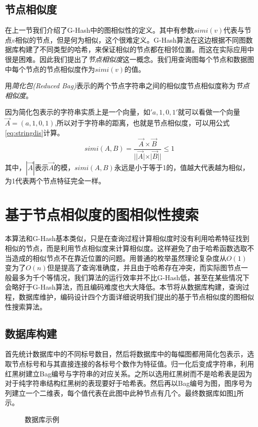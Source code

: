 \documentclass{XDBAthesis}
\begin{document}
\subsection{节点相似度}
在上一节我们介绍了G-Hash中的图相似性的定义。其中有参数$simi(v)$代表与节点$v$相似的节点，但是何为相似，这个很难定义。G-Hash算法在这边根据不同图数据库构建了不同类型的哈希，来保证相似的节点都在相邻位置。而这在实际应用中很是困难。因此我们提出了\emph{节点相似度}这一概念。我们用查询图每个节点和数据图中每个节点的节点相似度作为$simi(v)$的值。
\begin{defn}[节点相似度]
    用\emph{简化包(Reduced Bag)}表示的两个节点字符串之间的相似度节点相似度称为\emph{节点相似度}。
\end{defn}
因为简化包表示的字符串实质上是一个向量，如$'a,1,0,1'$就可以看做一个向量$\vec{A}=(a,1,0,1) $,所以对于字符串的距离，也就是节点相似度，可以用公式\eqref{eq:stringdis}计算。
\begin{equation}
    simi(A,B)=\frac{\vec{A}\times \vec{B}}{||\vec{A}|\times |\vec{B}||} \leq 1
    \label{eq:stringdis}
\end{equation}
其中，$|\vec{A}|$表示$\vec{A}$的模，$simi(A,B)$永远是小于等于1的，值越大代表越为相似，为1代表两个节点特征完全一样。
\section{基于节点相似度的图相似性搜索}
本算法和G-Hash\cite{ghash}基本类似，只是在查询过程计算相似度时没有利用哈希特征找到相似的节点，而是利用节点相似度来计算相似度。这样避免了由于哈希函数选取不当造成的相似节点不在靠近位置的问题。用普通的枚举虽然理论复杂度从$O(1)$变为了$O(n)$但是提高了查询准确度，并且由于哈希存在冲突，而实际图节点一般最多为千个等情况，我们算法的运行效率并不比G-Hash低，甚至在某些情况下会略好于G-Hash算法，而且编码难度也大大降低。本节将从数据库构建，查询过程，数据库维护，编码设计四个方面详细说明我们提出的基于节点相似度的图相似性搜索算法。
\subsection{数据库构建}
首先统计数据库中的不同标号数目，然后将数据库中的每幅图都用简化包表示，选取节点标号和与其直接连接的各标号个数作为特征值。归一化后变成字符串，利用红黑树建立Bag编号与字符串的对应关系。之所以选用红黑树而不是哈希表是因为对于纯字符串结构红黑树的表现要好于哈希表。然后再以Bag编号为图，图序号为列建立一个二维表，每个值代表在此图中此种节点有几个。最终数据库如图\ref{fg:ghashdatabase}所示。
\begin{figure}
    \caption{数据库示例}
    \label{fg:ghashdatabase}
\end{figure}
\end{document}
